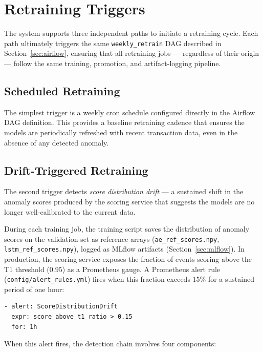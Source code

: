 \section{Retraining Triggers}
\label{sec:retrain-triggers}

The system supports three independent paths to initiate a retraining cycle.
Each path ultimately triggers the same \texttt{weekly\_retrain} DAG
described in Section~\ref{sec:airflow}, ensuring that all retraining jobs
--- regardless of their origin --- follow the same training, promotion, and
artifact-logging pipeline.

\subsection{Scheduled Retraining}

The simplest trigger is a weekly cron schedule configured directly in the
Airflow DAG definition. This provides a baseline retraining cadence that
ensures the models are periodically refreshed with recent transaction data,
even in the absence of any detected anomaly.

\subsection{Drift-Triggered Retraining}

The second trigger detects \textit{score distribution drift} --- a
sustained shift in the anomaly scores produced by the scoring service that
suggests the models are no longer well-calibrated to the current data.

During each training job, the training script saves the distribution of
anomaly scores on the validation set as reference arrays
(\texttt{ae\_ref\_scores.npy}, \texttt{lstm\_ref\_scores.npy}), logged as
MLflow artifacts (Section~\ref{sec:mlflow}). In production, the scoring
service exposes the fraction of events scoring above the T1 threshold
($0.95$) as a Prometheus gauge. A Prometheus alert rule
(\texttt{config/alert\_rules.yml}) fires when this fraction exceeds 15\%
for a sustained period of one hour:

\begin{verbatim}
- alert: ScoreDistributionDrift
  expr: score_above_t1_ratio > 0.15
  for: 1h
\end{verbatim}

When this alert fires, the detection chain involves four components:

